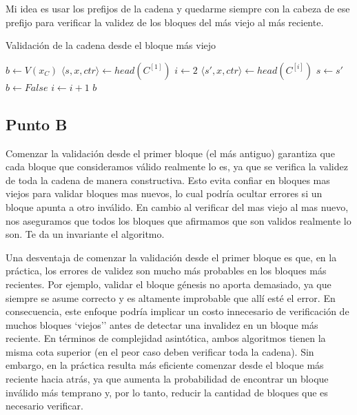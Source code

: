 \documentclass[12pt]{article}
\begin{document}
Mi idea es usar los prefijos de la cadena y quedarme siempre con la cabeza de ese prefijo para verificar la validez de los bloques del más viejo al más reciente.  

\begin{algorithm}[H]
\caption{Validación de la cadena desde el bloque más viejo}
\begin{algorithmic}[1]
    \State $b \gets V(x_C)$ 
        \State $\langle s, x, ctr \rangle \gets head(C^{[1]})$ 
         
            \State $i \gets 2$ 
            \Repeat {}
                \State $\langle s', x, ctr \rangle \gets head(C^{[i]})$ 
                 
                    \State $s \gets s'$ 
                \Else
                    \State $b \gets False$
                \EndIf
                \State $i \gets i + 1$
        \EndIf
    \EndIf
    \State \Return $b$
\EndFunction
\end{algorithmic}
\end{algorithm}

\subsection*{Punto B}

Comenzar la validación desde el primer bloque (el más antiguo) garantiza que cada bloque que consideramos válido realmente lo es, ya que se verifica la validez de toda la cadena de manera constructiva. Esto evita confiar en bloques mas viejos para validar bloques mas nuevos, lo cual podría ocultar errores si un bloque apunta a otro inválido. En cambio al verificar del mas viejo al mas nuevo, nos aseguramos que todos los bloques que afirmamos que son validos realmente lo son.
Te da un invariante el algoritmo.

Una desventaja de comenzar la validación desde el primer bloque es que, en la práctica, los errores de validez son mucho más probables en los bloques más recientes. Por ejemplo, validar el bloque génesis no aporta demasiado, ya que siempre se asume correcto y es altamente improbable que allí esté el error. En consecuencia, este enfoque podría implicar un costo innecesario de verificación de muchos bloques `viejos'' antes de detectar una invalidez en un bloque más reciente. En términos de complejidad asintótica, ambos algoritmos tienen la misma cota superior (en el peor caso deben verificar toda la cadena). Sin embargo, en la práctica resulta más eficiente comenzar desde el bloque más reciente hacia atrás, ya que aumenta la probabilidad de encontrar un bloque inválido más temprano y, por lo tanto, reducir la cantidad de bloques que es necesario verificar.
\end{document}
